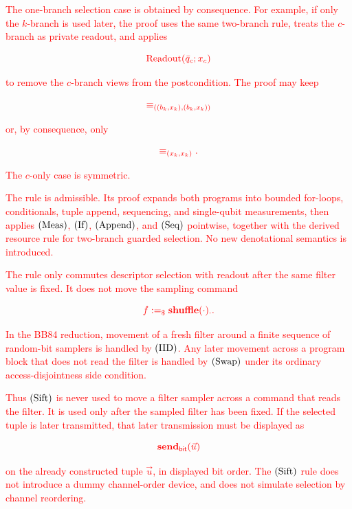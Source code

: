 \documentclass[acmsmall,screen,review,anonymous,nonacm]{acmart}
\theoremstyle{defn_style}
\begin{document}
\textcolor{red}{The one-branch selection case is obtained by consequence. For example, if only the \(k\)-branch is used later, the proof uses the same two-branch rule, treats the \(c\)-branch as private readout, and applies}

\[
\textcolor{red}{
\operatorname{Readout}(\bar q_c;x_c)
}
\]

\textcolor{red}{to remove the \(c\)-branch views from the postcondition. The proof may keep}

\[
\textcolor{red}{
\equiv_{((b_k,x_k),(b_k,x_k))}
}
\]

\textcolor{red}{or, by consequence, only}

\[
\textcolor{red}{
\equiv_{(x_k,x_k)}.
}
\]

\textcolor{red}{The \(c\)-only case is symmetric.}

\textcolor{red}{The rule is admissible. Its proof expands both programs into bounded for-loops, conditionals, tuple append, sequencing, and single-qubit measurements, then applies \({\rm (Meas)}\), \({\rm (If)}\), \({\rm (Append)}\), and \({\rm (Seq)}\) pointwise, together with the derived resource rule for two-branch guarded selection. No new denotational semantics is introduced.}

\textcolor{red}{The rule only commutes descriptor selection with readout after the same filter value is fixed. It does not move the sampling command}

\[
\textcolor{red}{
f:=_{\$}\mathbf{shuffle}(\cdot)_{\cdot}.
}
\]

\textcolor{red}{In the BB84 reduction, movement of a fresh filter around a finite sequence of random-bit samplers is handled by \({\rm (IID)}\). Any later movement across a program block that does not read the filter is handled by \({\rm (Swap)}\) under its ordinary access-disjointness side condition.}

\textcolor{red}{Thus \({\rm (Sift)}\) is never used to move a filter sampler across a command that reads the filter. It is used only after the sampled filter has been fixed. If the selected tuple is later transmitted, that later transmission must be displayed as}

\[
\textcolor{red}{
\mathbf{send}_{\mathsf{bit}}(\vec u)
}
\]

\textcolor{red}{on the already constructed tuple \(\vec u\), in displayed bit order. The \({\rm (Sift)}\) rule does not introduce a dummy channel-order device, and does not simulate selection by channel reordering.}
\end{document}
